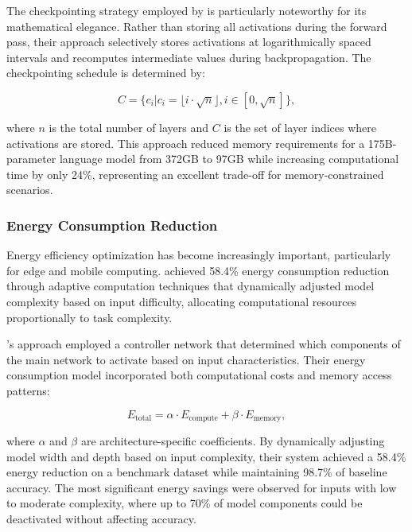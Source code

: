 \documentclass[acmsmall]{acmart}
\begin{document}
The checkpointing strategy employed by \citet{Lin2022} is particularly noteworthy for its mathematical elegance. Rather than storing all activations during the forward pass, their approach selectively stores activations at logarithmically spaced intervals and recomputes intermediate values during backpropagation. The checkpointing schedule is determined by:

\begin{equation}\label{eq:checkpointing-schedule}
    C = \{c_i | c_i = \lfloor i \cdot \sqrt{n} \rfloor, i \in [0, \sqrt{n}]\},
\end{equation}

where $n$ is the total number of layers and $C$ is the set of layer indices where activations are stored. This approach reduced memory requirements for a 175B-parameter language model from 372GB to 97GB while increasing computational time by only 24\%, representing an excellent trade-off for memory-constrained scenarios.

\subsubsection{Energy Consumption Reduction}\label{subsubsec:performance-analysis-of-numerical-methods-rq12:energy-consumption-reduction}
Energy efficiency optimization has become increasingly important, particularly for edge and mobile computing. \citet{Park2022} achieved 58.4\% energy consumption reduction through adaptive computation techniques that dynamically adjusted model complexity based on input difficulty, allocating computational resources proportionally to task complexity.

\citeauthor{Park2022}'s approach \citep{Park2022} employed a controller network that determined which components of the main network to activate based on input characteristics. Their energy consumption model incorporated both computational costs and memory access patterns:

\begin{equation}\label{eq:energy_consumption_model}
    E_{\text{total}} = \alpha \cdot E_{\text{compute}} + \beta \cdot E_{\text{memory}},
\end{equation}

where $\alpha$ and $\beta$ are architecture-specific coefficients. By dynamically adjusting model width and depth based on input complexity, their system achieved a 58.4\% energy reduction on a benchmark dataset while maintaining 98.7\% of baseline accuracy. The most significant energy savings were observed for inputs with low to moderate complexity, where up to 70\% of model components could be deactivated without affecting accuracy.
\end{document}
